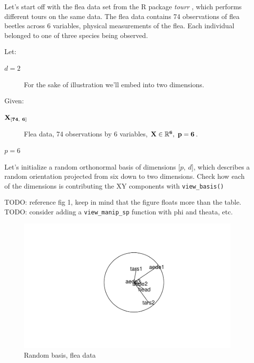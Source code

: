 \documentclass{monashthesis}
\begin{document}
Let's start off with the flea data set from the R package \emph{tourr}
\autocite{wickham_tourr_2011}, which performs different tours on the
same data. The flea data contains 74 observations of flea beetles across
6 variables, physical measurements of the flea. Each individual belonged
to one of three species being observed.

Let:

\begin{description}
  \item[$d=2$] For the sake of illustration we'll embed into two dimensions.
\end{description}

Given:

\begin{description}
  \item[$\bf{X}_{[74,~6]}$] Flea data, 74 observations by 6 variables, $\bf{X} \in \mathbb{R}^6, ~p=6$.
  \item[$p=6$]
\end{description}

Let's initialize a random orthonormal basis of dimensions
{[}\(p,~d\){]}, which describes a random orientation projected from six
down to two dimensions. Check how each of the dimensions is contributing
the XY components with \texttt{view\_basis()}

TODO: reference fig 1, keep in mind that the figure floats more than the
table. TODO: consider adding a \texttt{view\_manip\_sp} function with
phi and theata, etc.

\begin{figure}
\centering
\includegraphics{thesis_files/figure-latex/unnamed-chunk-1-1.pdf}
\caption{\label{fig:unnamed-chunk-1}Random basis, flea data}
\end{figure}
\end{document}
